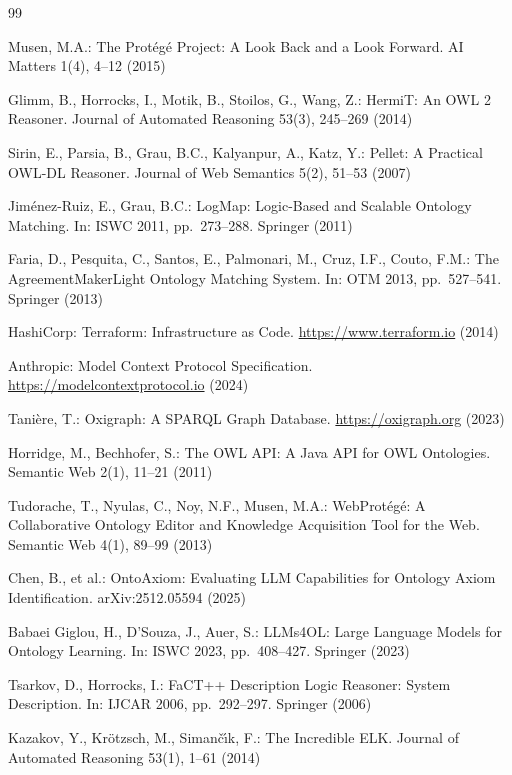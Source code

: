 \documentclass[runningheads]{llncs}
\begin{document}

\begin{thebibliography}{99}

Musen, M.A.: The Prot\'eg\'e Project: A Look Back and a Look Forward. AI Matters 1(4), 4--12 (2015)

Glimm, B., Horrocks, I., Motik, B., Stoilos, G., Wang, Z.: HermiT: An OWL 2 Reasoner. Journal of Automated Reasoning 53(3), 245--269 (2014)

Sirin, E., Parsia, B., Grau, B.C., Kalyanpur, A., Katz, Y.: Pellet: A Practical OWL-DL Reasoner. Journal of Web Semantics 5(2), 51--53 (2007)

Jim\'enez-Ruiz, E., Grau, B.C.: LogMap: Logic-Based and Scalable Ontology Matching. In: ISWC 2011, pp.\ 273--288. Springer (2011)

Faria, D., Pesquita, C., Santos, E., Palmonari, M., Cruz, I.F., Couto, F.M.: The AgreementMakerLight Ontology Matching System. In: OTM 2013, pp.\ 527--541. Springer (2013)

HashiCorp: Terraform: Infrastructure as Code. \url{https://www.terraform.io} (2014)

Anthropic: Model Context Protocol Specification. \url{https://modelcontextprotocol.io} (2024)

Tani\`ere, T.: Oxigraph: A SPARQL Graph Database. \url{https://oxigraph.org} (2023)

Horridge, M., Bechhofer, S.: The OWL API: A Java API for OWL Ontologies. Semantic Web 2(1), 11--21 (2011)

Tudorache, T., Nyulas, C., Noy, N.F., Musen, M.A.: WebProt\'eg\'e: A Collaborative Ontology Editor and Knowledge Acquisition Tool for the Web. Semantic Web 4(1), 89--99 (2013)

Chen, B., et al.: OntoAxiom: Evaluating LLM Capabilities for Ontology Axiom Identification. arXiv:2512.05594 (2025)

Babaei Giglou, H., D'Souza, J., Auer, S.: LLMs4OL: Large Language Models for Ontology Learning. In: ISWC 2023, pp.\ 408--427. Springer (2023)

Tsarkov, D., Horrocks, I.: FaCT++ Description Logic Reasoner: System Description. In: IJCAR 2006, pp.\ 292--297. Springer (2006)

Kazakov, Y., Kr\"otzsch, M., Siman\v{c}\'{\i}k, F.: The Incredible ELK. Journal of Automated Reasoning 53(1), 1--61 (2014)


\end{thebibliography}
\end{document}
